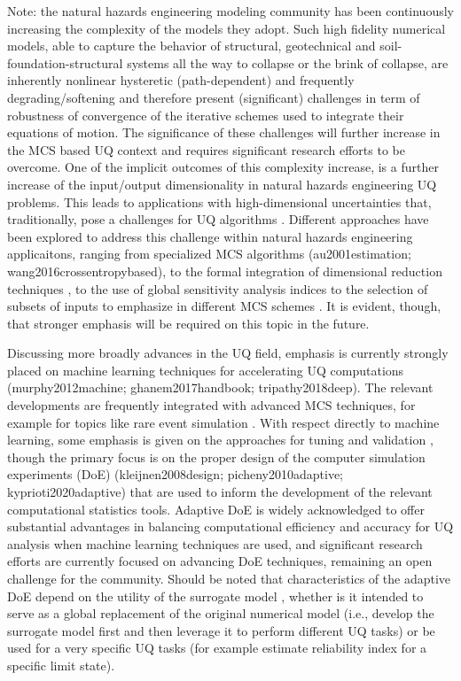 Note: the natural hazards engineering modeling community has been continuously increasing the complexity of the models they adopt. Such high fidelity numerical models, able to capture the behavior of structural, geotechnical and soil-foundation-structural systems all the way to collapse or the brink of collapse, are inherently nonlinear hysteretic (path-dependent) and frequently degrading/softening and therefore present (significant) challenges in term of robustness of convergence of the iterative schemes used to integrate their equations of motion. The significance of these challenges will further increase in the MCS based UQ context and requires significant research efforts to be overcome. One of the implicit outcomes of this complexity increase, is a further increase of the input/output dimensionality in natural hazards engineering UQ problems. This leads to applications with high-dimensional uncertainties that, traditionally, pose a challenges for UQ algorithms \citep{au2003importance,schueller2004critical}. Different approaches have been explored to address this challenge within natural hazards engineering applicaitons, ranging from specialized MCS algorithms (au2001estimation; wang2016crossentropybased), to the formal integration of dimensional reduction techniques \citep{jia2013kriging}, to the use of global sensitivity analysis indices to the selection of subsets of inputs to emphasize in different MCS schemes \citep{jia2014adaptive}. It is evident, though, that stronger emphasis will be required on this topic in the future.     

Discussing more broadly advances in the UQ field, emphasis is currently strongly placed on machine learning techniques for accelerating UQ computations (murphy2012machine; ghanem2017handbook; tripathy2018deep). The relevant developments are frequently integrated with advanced MCS techniques, for example for topics like rare event simulation \citep{li2011efficient,balesdent2013krigingbased,bourinet2016rareevent}. With respect directly to machine learning, some emphasis is given on the approaches for tuning and validation \citep{mehmani2018concurrent}, though the primary focus is on the proper design of the computer simulation experiments (DoE) (kleijnen2008design; picheny2010adaptive; kyprioti2020adaptive) that are used to inform the development of the relevant computational statistics tools. Adaptive DoE is widely acknowledged to offer substantial advantages in balancing computational efficiency and accuracy for UQ analysis when machine learning techniques are used, and significant research efforts are currently focused on advancing DoE techniques, remaining an open challenge for the community. Should be noted that characteristics of the adaptive DoE depend on the utility of the surrogate model \citep{liu2018survey}, whether is it intended to serve as a global replacement of the original numerical model (i.e., develop the surrogate model first and then leverage it to perform different UQ tasks) or be used for a very specific UQ tasks (for example estimate reliability index for a specific limit state). 

